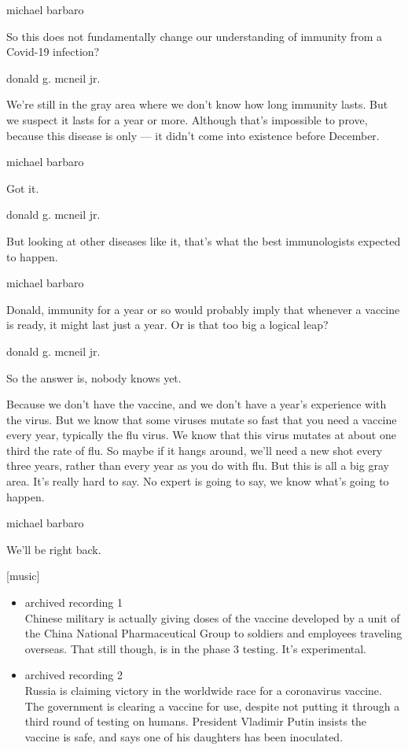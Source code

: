 michael barbaro

So this does not fundamentally change our understanding of immunity from
a Covid-19 infection?

donald g. mcneil jr.

We're still in the gray area where we don't know how long immunity
lasts. But we suspect it lasts for a year or more. Although that's
impossible to prove, because this disease is only --- it didn't come
into existence before December.

michael barbaro

Got it.

donald g. mcneil jr.

But looking at other diseases like it, that's what the best
immunologists expected to happen.

michael barbaro

Donald, immunity for a year or so would probably imply that whenever a
vaccine is ready, it might last just a year. Or is that too big a
logical leap?

donald g. mcneil jr.

So the answer is, nobody knows yet.

Because we don't have the vaccine, and we don't have a year's experience
with the virus. But we know that some viruses mutate so fast that you
need a vaccine every year, typically the flu virus. We know that this
virus mutates at about one third the rate of flu. So maybe if it hangs
around, we'll need a new shot every three years, rather than every year
as you do with flu. But this is all a big gray area. It's really hard to
say. No expert is going to say, we know what's going to happen.

michael barbaro

We'll be right back.

{[}music{]}

\begin{itemize}
\item
  archived recording 1\\
  Chinese military is actually giving doses of the vaccine developed by
  a unit of the China National Pharmaceutical Group to soldiers and
  employees traveling overseas. That still though, is in the phase 3
  testing. It's experimental.
\item
  archived recording 2\\
  Russia is claiming victory in the worldwide race for a coronavirus
  vaccine. The government is clearing a vaccine for use, despite not
  putting it through a third round of testing on humans. President
  Vladimir Putin insists the vaccine is safe, and says one of his
  daughters has been inoculated.
\end{itemize}

